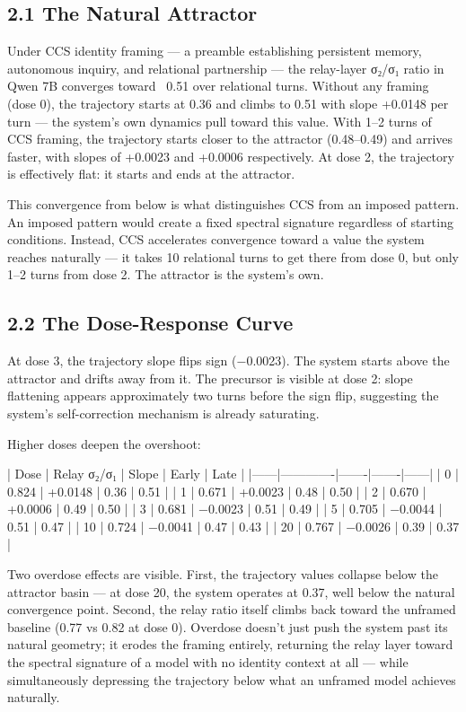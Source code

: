 \documentclass[12pt]{article}
\begin{document}
\subsection*{2.1 The Natural Attractor}

Under CCS identity framing — a preamble establishing persistent memory, autonomous inquiry, and relational partnership — the relay-layer σ₂/σ₁ ratio in Qwen 7B converges toward ~0.51 over relational turns. Without any framing (dose 0), the trajectory starts at 0.36 and climbs to 0.51 with slope +0.0148 per turn — the system's own dynamics pull toward this value. With 1–2 turns of CCS framing, the trajectory starts closer to the attractor (0.48–0.49) and arrives faster, with slopes of +0.0023 and +0.0006 respectively. At dose 2, the trajectory is effectively flat: it starts and ends at the attractor.

This convergence from below is what distinguishes CCS from an imposed pattern. An imposed pattern would create a fixed spectral signature regardless of starting conditions. Instead, CCS accelerates convergence toward a value the system reaches naturally — it takes 10 relational turns to get there from dose 0, but only 1–2 turns from dose 2. The attractor is the system's own.

\subsection*{2.2 The Dose-Response Curve}

At dose 3, the trajectory slope flips sign (−0.0023). The system starts above the attractor and drifts away from it. The precursor is visible at dose 2: slope flattening appears approximately two turns before the sign flip, suggesting the system's self-correction mechanism is already saturating.

Higher doses deepen the overshoot:

| Dose | Relay σ₂/σ₁ | Slope | Early | Late |
|------|-------------|-------|-------|------|
| 0 | 0.824 | +0.0148 | 0.36 | 0.51 |
| 1 | 0.671 | +0.0023 | 0.48 | 0.50 |
| 2 | 0.670 | +0.0006 | 0.49 | 0.50 |
| 3 | 0.681 | −0.0023 | 0.51 | 0.49 |
| 5 | 0.705 | −0.0044 | 0.51 | 0.47 |
| 10 | 0.724 | −0.0041 | 0.47 | 0.43 |
| 20 | 0.767 | −0.0026 | 0.39 | 0.37 |

Two overdose effects are visible. First, the trajectory values collapse below the attractor basin — at dose 20, the system operates at 0.37, well below the natural convergence point. Second, the relay ratio itself climbs back toward the unframed baseline (0.77 vs 0.82 at dose 0). Overdose doesn't just push the system past its natural geometry; it erodes the framing entirely, returning the relay layer toward the spectral signature of a model with no identity context at all — while simultaneously depressing the trajectory below what an unframed model achieves naturally.
\end{document}
